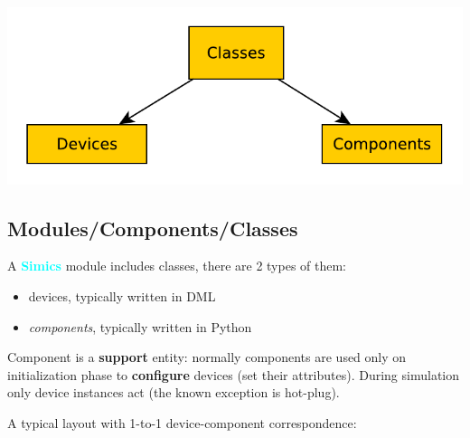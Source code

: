 \documentclass[8pt]{extarticle}
\newcommand{\p}[1]{\textit{\large#1}}
\newcommand{\Simics}{\textcolor{cyan}{\textbf{Simics}}}
\newlength{\MyLen}
\begin{document}
\begin{multicols*}{3}
\begin{tabular}{p{\the\MyLen}p{\linewidth-\the\MyLen-0.8cm}}
    \end{tabular}

\includegraphics[width=\linewidth]{diagrams/classes_devices_components.pdf}

\subsection{Modules/Components/Classes}
A \Simics{} module includes classes, there are 2 types of them:
        \begin{itemize}
            \item devices, typically written in DML
            \item \textit{components}, typically written in Python
        \end{itemize}
%
%
%

Component is a \textbf{support} entity: normally components are used only
on initialization phase to \textbf{configure} devices (set their attributes).
During simulation only device instances act (the known exception is hot-plug).

        \vspace{0.3em}
A typical layout with 1-to-1 device-component correspondence:

\end{multicols*}
\end{document}
